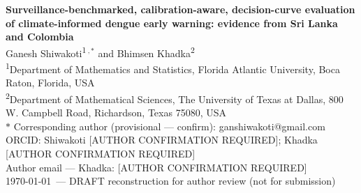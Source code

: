 \documentclass[11pt,a4paper]{article}
\begin{document}
\begin{center}
{\Large \textbf{Surveillance-benchmarked, calibration-aware, decision-curve evaluation of climate-informed dengue early warning: evidence from Sri Lanka and Colombia}}\\[1.2em]

Ganesh Shiwakoti\textsuperscript{1}\,$^{,\ast}$ and Bhimsen Khadka\textsuperscript{2}\\[0.6em]

\footnotesize
\textsuperscript{1}Department of Mathematics and Statistics, Florida Atlantic University, Boca Raton, Florida, USA\\
\textsuperscript{2}Department of Mathematical Sciences, The University of Texas at Dallas, 800 W. Campbell Road, Richardson, Texas 75080, USA\\[0.4em]
$\ast$ Corresponding author (provisional --- confirm): ganshiwakoti@gmail.com\\
ORCID: Shiwakoti [AUTHOR CONFIRMATION REQUIRED]; Khadka [AUTHOR CONFIRMATION REQUIRED]\\
Author email — Khadka: [AUTHOR CONFIRMATION REQUIRED]\\[0.4em]
\today\ — DRAFT reconstruction for author review (not for submission)
\end{center}

\vspace{0.5em}
\end{document}
